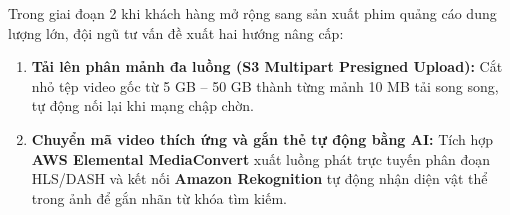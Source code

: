 \documentclass[12pt,a4paper]{report}
\begin{document}
Trong giai đoạn 2 khi khách hàng mở rộng sang sản xuất phim quảng cáo dung lượng lớn, đội ngũ tư vấn đề xuất hai hướng nâng cấp:
\begin{enumerate}[leftmargin=0.7cm]
  \item \textbf{Tải lên phân mảnh đa luồng (S3 Multipart Presigned Upload):} Cắt nhỏ tệp video gốc từ 5 GB -- 50 GB thành từng mảnh 10 MB tải song song, tự động nối lại khi mạng chập chờn.
  \item \textbf{Chuyển mã video thích ứng và gắn thẻ tự động bằng AI:} Tích hợp \textbf{AWS Elemental MediaConvert} xuất luồng phát trực tuyến phân đoạn HLS/DASH và kết nối \textbf{Amazon Rekognition} tự động nhận diện vật thể trong ảnh để gắn nhãn từ khóa tìm kiếm.
\end{enumerate}
\end{document}
